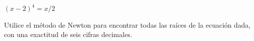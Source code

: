\item $(x - 2)^4 = x/2$
\par
Utilice el método de Newton para encontrar todas las raíces de la ecuación dada, con una exactitud de seis cifras decimales.
